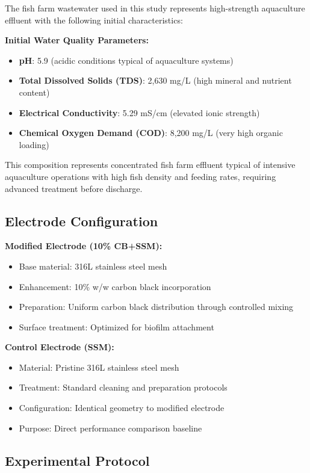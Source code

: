 \documentclass[12pt,a4paper]{article}
\begin{document}
The fish farm wastewater used in this study represents high-strength aquaculture effluent with the following initial characteristics:

\textbf{Initial Water Quality Parameters:}
\begin{itemize}
    \item \textbf{pH}: 5.9 (acidic conditions typical of aquaculture systems)
    \item \textbf{Total Dissolved Solids (TDS)}: 2,630 mg/L (high mineral and nutrient content)
    \item \textbf{Electrical Conductivity}: 5.29 mS/cm (elevated ionic strength)
    \item \textbf{Chemical Oxygen Demand (COD)}: 8,200 mg/L (very high organic loading)
\end{itemize}

This composition represents concentrated fish farm effluent typical of intensive aquaculture operations with high fish density and feeding rates, requiring advanced treatment before discharge.

\subsection{Electrode Configuration}

\textbf{Modified Electrode (10\% CB+SSM):}
\begin{itemize}
    \item Base material: 316L stainless steel mesh
    \item Enhancement: 10\% w/w carbon black incorporation
    \item Preparation: Uniform carbon black distribution through controlled mixing
    \item Surface treatment: Optimized for biofilm attachment
\end{itemize}

\textbf{Control Electrode (SSM):}
\begin{itemize}
    \item Material: Pristine 316L stainless steel mesh
    \item Treatment: Standard cleaning and preparation protocols
    \item Configuration: Identical geometry to modified electrode
    \item Purpose: Direct performance comparison baseline
\end{itemize}

\subsection{Experimental Protocol}
\end{document}
